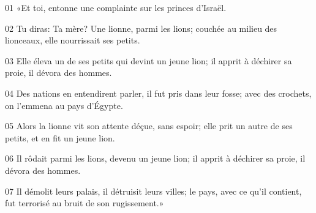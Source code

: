 01 «Et toi, entonne une complainte sur les princes d’Israël.

02 Tu diras: Ta mère? Une lionne, parmi les lions; couchée au milieu des lionceaux, elle nourrissait ses petits.

03 Elle éleva un de ses petits qui devint un jeune lion; il apprit à déchirer sa proie, il dévora des hommes.

04 Des nations en entendirent parler, il fut pris dans leur fosse; avec des crochets, on l’emmena au pays d’Égypte.

05 Alors la lionne vit son attente déçue, sans espoir; elle prit un autre de ses petits, et en fit un jeune lion.

06 Il rôdait parmi les lions, devenu un jeune lion; il apprit à déchirer sa proie, il dévora des hommes.

07 Il démolit leurs palais, il détruisit leurs villes; le pays, avec ce qu’il contient, fut terrorisé au bruit de son rugissement.»